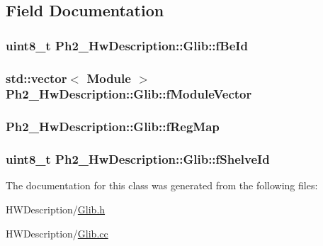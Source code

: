 \subsection{Field Documentation}
\hypertarget{class_ph2___hw_description_1_1_glib_ac89e9a9eee11e41f901e90c619e50bfc}{
\subsubsection[{f\-Be\-Id}]{\setlength{\rightskip}{0pt plus 5cm}uint8\-\_\-t Ph2\-\_\-\-Hw\-Description\-::\-Glib\-::f\-Be\-Id\hspace{0.3cm}{\ttfamily [protected]}}}\label{class_ph2___hw_description_1_1_glib_ac89e9a9eee11e41f901e90c619e50bfc}
\hypertarget{class_ph2___hw_description_1_1_glib_a97b6535900b4fa8eef81c7e15a01cda4}{
\subsubsection[{f\-Module\-Vector}]{\setlength{\rightskip}{0pt plus 5cm}std\-::vector$<$ {\bf Module} $>$ Ph2\-\_\-\-Hw\-Description\-::\-Glib\-::f\-Module\-Vector\hspace{0.3cm}{\ttfamily [protected]}}}\label{class_ph2___hw_description_1_1_glib_a97b6535900b4fa8eef81c7e15a01cda4}
\hypertarget{class_ph2___hw_description_1_1_glib_a1a0c6dba5a24c615e8609b03012a8970}{
\subsubsection[{f\-Reg\-Map}]{ Ph2\-\_\-\-Hw\-Description\-::\-Glib\-::f\-Reg\-Map\hspace{0.3cm}{\ttfamily [protected]}}}\label{class_ph2___hw_description_1_1_glib_a1a0c6dba5a24c615e8609b03012a8970}
\hypertarget{class_ph2___hw_description_1_1_glib_abcaa5b1cb716d3aa814688dd5691a421}{
\subsubsection[{f\-Shelve\-Id}]{\setlength{\rightskip}{0pt plus 5cm}uint8\-\_\-t Ph2\-\_\-\-Hw\-Description\-::\-Glib\-::f\-Shelve\-Id\hspace{0.3cm}{\ttfamily [protected]}}}\label{class_ph2___hw_description_1_1_glib_abcaa5b1cb716d3aa814688dd5691a421}


The documentation for this class was generated from the following files\-:\begin{DoxyCompactItemize}
\item 
H\-W\-Description/\hyperlink{_glib_8h}{Glib.\-h}\item 
H\-W\-Description/\hyperlink{_glib_8cc}{Glib.\-cc}\end{DoxyCompactItemize}
